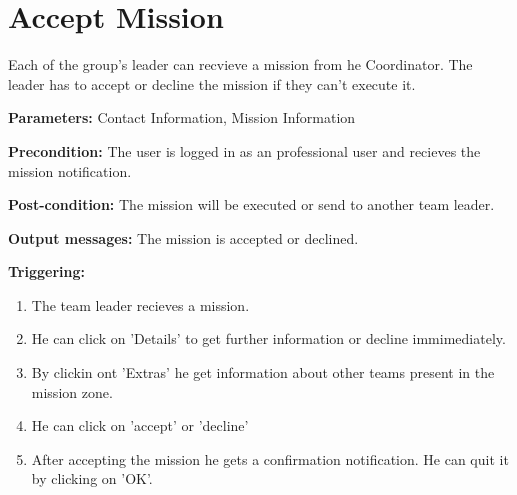 \section{Accept Mission}
\label{operation:AcceptMission}
Each of the group's leader can recvieve a mission from he Coordinator. The
leader has to accept or decline the mission if they can't execute it.\\
\begin{description}
\item \textbf{Parameters:} Contact Information, Mission Information
\item \textbf{Precondition:} The user is logged in as an professional user
and recieves the mission notification.
\item \textbf{Post-condition:} The mission will be executed or send to another
team leader.
\item \textbf{Output messages:} The mission is accepted or declined.
\item \textbf{Triggering:}
\begin{enumerate}
\item The team leader recieves a mission.
\item He can click on 'Details' to get further information or decline
immimediately.
\item By clickin ont 'Extras' he get information about other teams present in
the mission zone.
\item He can click on 'accept' or 'decline'
\item After accepting the mission he gets a confirmation notification. He can
quit it by clicking on 'OK'.
\end{enumerate}
\end{description} 


